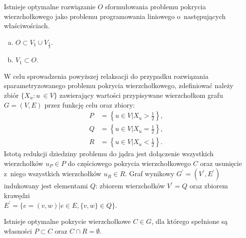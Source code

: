 \begin{theorem}
  Istnieje optymalne rozwiązanie $O$ sformułowania problemu pokrycia wierzchołkowego jako problemu programowania liniowego o~następujących właściwościach.
  \begin{enumerate}[(a)]
    \item $O \subset V_1 \cup V_{\frac{1}{2}}$.
    \item $V_1 \subset O$.
  \end{enumerate}
\end{theorem}
W celu sprowadzenia powyższej relaksacji do przypadku rozwiązania
sparametryzowanego problemu pokrycia wierzchołkowego, zdefiniować należy zbiór 
$\{ X_u : u~\in V \}$ zawierający wartości przypisywane wierzchołkom grafu 
$G=(V,E)$ przez funkcję celu oraz zbiory:\\
\begin{align*}
P&=\left\{u \in V | X_u>\frac{1}{2}\right\},\\
Q&=\left\{u \in V | X_u=\frac{1}{2}\right\},\\
R&=\left\{u \in V | X_u<\frac{1}{2}\right\}.
\end{align*}
Istotą redukcji dziedziny problemu do jądra jest dołączenie wszystkich
wierzchołków $u_P \in P$ do częściowego pokrycia wierzchołkowego $C$ oraz 
usunięcie z~niego wszystkich wierzchołków $u_R \in R$.
Graf wynikowy $G^\prime=(V^\prime, E^\prime)$ indukowany jest elementami $Q$: 
zbiorem wierzchołków $V^\prime=Q$ oraz zbiorem krawędzi\\$E^\prime=\{e=(v, w)| e \in E, \{v, w\} \in Q\}$.
\begin{theorem}
  Istnieje optymalne pokrycie wierzchołkowe $C \in G$, dla którego spełnione są własności $P \subset C$ oraz $C \cap R = \emptyset$.
\end{theorem}
